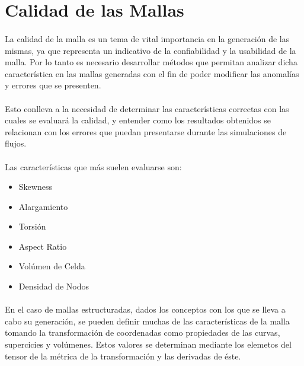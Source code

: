 \documentclass[letterpaper, openright, 12pt]{book}
\begin{document}
    \section{Calidad de las Mallas}
    \paragraph*{}
    La calidad de la malla es un tema de vital importancia en la generación
    de las mismas, ya que representa un indicativo de la confiabilidad y la
    usabilidad de la malla. Por lo tanto es necesario desarrollar métodos
    que permitan analizar dicha característica en las mallas generadas con
    el fin de poder modificar las anomalías y errores que se presenten.

    \paragraph*{}
    Esto conlleva a la necesidad de determinar las características correctas
    con las cuales se evaluará la calidad, y entender como los resultados
    obtenidos se relacionan con los errores que puedan presentarse durante
    las simulaciones de flujos.

    \paragraph*{}
    Las características que más suelen evaluarse son:
    \begin{itemize}
        \item Skewness
        \item Alargamiento
        \item Torsión
        \item Aspect Ratio
        \item Volúmen de Celda
        \item Densidad de Nodos
    \end{itemize}

    \paragraph*{}
    En el caso de mallas estructuradas, dados los conceptos con los que se
    lleva a cabo su generación, se pueden definir muchas de las
    características de la malla tomando la transformación de coordenadas
    como propiedades de las curvas, supercicies y volúmenes. Estos valores
    se determinan mediante los elemetos del tensor de la métrica de la
    transformación y las derivadas de éste. \cite{vladimir-grid}
\end{document}
